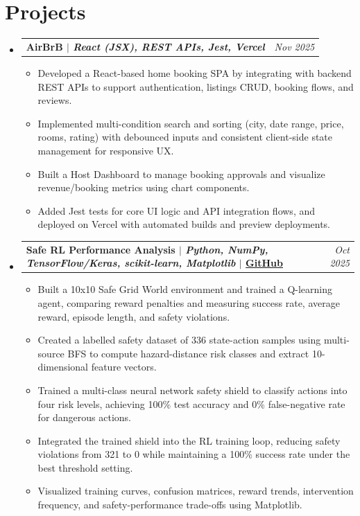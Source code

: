 \documentclass[10pt, a4paper]{article}
\makeatletter
\newcommand{\resumeItem}[1]{
  \item\small{
    {#1 \vspace{-2pt}}
  }
}
\newcommand{\resumeProjectHeading}[2]{
    \vspace{-1pt}\item
    \begin{tabular*}{0.97\textwidth}{l@{\extracolsep{\fill}}r}
      \textbf{#1} & \textit{\small #2} \\
    \end{tabular*}\vspace{-5pt}
}
\newenvironment{resumeItemList}{\begin{itemize}[leftmargin=0.15in, label={}]}{\end{itemize}}
\makeatother
\begin{document}
\section{Projects}
  \begin{resumeItemList}
  
    \resumeProjectHeading
      {\textbf{AirBrB} $|$ \emph{React (JSX), REST APIs, Jest, Vercel}}{Nov 2025}
      \begin{itemize}[leftmargin=0.15in]
        \resumeItem{Developed a React-based home booking SPA by integrating with backend REST APIs to support authentication, listings CRUD, booking flows, and reviews.}
        \resumeItem{Implemented multi-condition search and sorting (city, date range, price, rooms, rating) with debounced inputs and consistent client-side state management for responsive UX.}
        \resumeItem{Built a Host Dashboard to manage booking approvals and visualize revenue/booking metrics using chart components.}
        \resumeItem{Added Jest tests for core UI logic and API integration flows, and deployed on Vercel with automated builds and preview deployments.}
      \end{itemize}
    


    \resumeProjectHeading
      {\textbf{Safe RL Performance Analysis} $|$ \emph{Python, NumPy, TensorFlow/Keras, scikit-learn, Matplotlib} $|$ \href{https://github.com/Zhejian-Zheng/RL-and-Supervised-Learning}{\textbf{GitHub}}}{Oct 2025}
      \begin{itemize}[leftmargin=0.15in]
        \resumeItem{Built a 10x10 Safe Grid World environment and trained a Q-learning agent, comparing reward penalties and measuring success rate, average reward, episode length, and safety violations.}
        \resumeItem{Created a labelled safety dataset of 336 state-action samples using multi-source BFS to compute hazard-distance risk classes and extract 10-dimensional feature vectors.}
        \resumeItem{Trained a multi-class neural network safety shield to classify actions into four risk levels, achieving 100\% test accuracy and 0\% false-negative rate for dangerous actions.}
        \resumeItem{Integrated the trained shield into the RL training loop, reducing safety violations from 321 to 0 while maintaining a 100\% success rate under the best threshold setting.}
        \resumeItem{Visualized training curves, confusion matrices, reward trends, intervention frequency, and safety-performance trade-offs using Matplotlib.}
      \end{itemize}




\end{resumeItemList}
\end{document}
